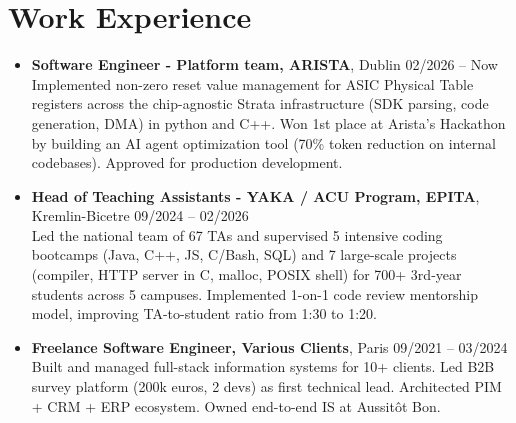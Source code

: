 \documentclass[9pt,a4paper]{article}
\begin{document}
\section*{Work Experience}
\begin{tcolorbox}[mybox]
\begin{itemize}
\item\textbf{Software Engineer - Platform team, ARISTA}, Dublin \hfill {\small02/2026 – Now}\\[0.5em]
\textcolor{gray!40!black}{Implemented non-zero reset value management for ASIC Physical Table registers across the chip-agnostic Strata infrastructure (SDK parsing, code generation, DMA) in python and C++.
Won 1st place at Arista's Hackathon by building an AI agent optimization tool (70\% token reduction on internal codebases). Approved for production development.}

\item\textbf{Head of Teaching Assistants - YAKA / ACU Program, EPITA}, Kremlin-Bicetre \hfill {\small09/2024 – 02/2026}\\[0.5em]
\textcolor{gray!40!black}{Led the national team of 67 TAs and supervised 5 intensive coding bootcamps (Java, C++, JS, C/Bash, SQL) and 7 large-scale projects (compiler, HTTP server in C, malloc, POSIX shell) for 700+ 3rd-year students across 5 campuses. Implemented 1-on-1 code review mentorship model, improving TA-to-student ratio from 1:30 to 1:20.}

\item\textbf{Freelance Software Engineer, Various Clients}, Paris \hfill {\small09/2021 – 03/2024}\\[0.5em]
\textcolor{gray!40!black}{Built and managed full-stack information systems for 10+ clients. Led B2B survey platform (200k euros, 2 devs) as first technical lead. Architected PIM + CRM + ERP ecosystem. Owned end-to-end IS at Aussitôt Bon.}
\end{itemize}
\end{tcolorbox}
\end{document}
